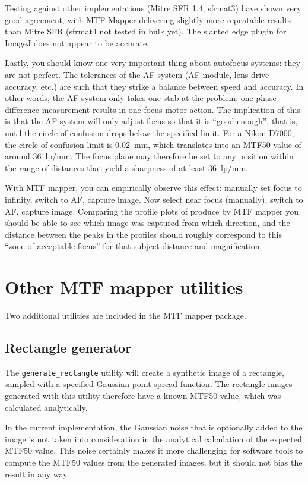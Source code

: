\documentclass[a4paper]{article}
\begin{document}
Testing against other implementations (Mitre SFR 1.4, sfrmat3) have shown
very good agreement, with MTF Mapper delivering slightly more repeatable
results than Mitre SFR (sfrmat4 not tested in bulk yet). The slanted edge
plugin for ImageJ does not appear to be accurate.

Lastly, you should know one very important thing about autofocus systems:
they are not perfect. The tolerances of the AF system (AF module, lens
drive accuracy, etc.) are such that they strike a balance between speed and
accuracy. In other words, the AF system only takes one stab at the problem:
one phase difference measurement results in one focus motor action. The
implication of this is that the AF system will only adjust focus so that it 
is ``good enough'', that is, until the circle of confusion drops below the 
specified limit. For a Nikon D7000, the circle of
confusion limit is 0.02~mm, which translates into an MTF50 value of around
36~lp/mm. The focus plane may therefore be set to any position within the
range of distances that yield a sharpness of at least 36~lp/mm.

With MTF mapper, you can empirically observe this effect:
manually set focus to infinity, switch to AF, capture image. Now select near
focus (manually), switch to AF, capture image. Comparing the profile plots
of produce by MTF mapper you should be able to see which image was captured
from which direction, and the distance between the peaks in the profiles
should roughly correspond to this ``zone of acceptable focus'' for that
subject distance and magnification.


\section{Other MTF mapper utilities}
Two additional utilities are included in the MTF mapper package.
\subsection{Rectangle generator}
\label{sec:rectangle_generator}
The \texttt{generate\_rectangle} utility will create a synthetic image of a
rectangle, sampled with a specified Gaussian point spread function. The
rectangle images generated with this utility therefore have a known MTF50
value, which was calculated analytically.

In the current implementation, the Gaussian noise that is optionally added
to the image is not taken into consideration in the analytical calculation
of the expected MTF50 value. This noise certainly makes it more challenging
for software tools to compute the MTF50 values from the generated images,
but it should not bias the result in any way. 
\end{document}
